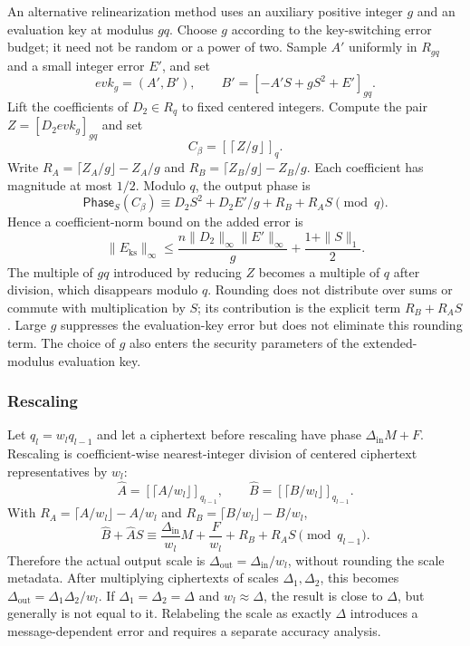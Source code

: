 An alternative relinearization method uses an auxiliary positive integer $g$ and an evaluation key at modulus $gq$. Choose $g$ according to the key-switching error budget; it need not be random or a power of two. Sample $A'$ uniformly in $R_{gq}$ and a small integer error $E'$, and set
\[
\mathit{evk}_g=(A',B'),\qquad B'=[-A'S+gS^2+E']_{gq}.
\]
Lift the coefficients of $D_2\in R_q$ to fixed centered integers. Compute the pair $Z=[D_2\mathit{evk}_g]_{gq}$ and set
\[
C_\beta=\left[\left\lceil Z/g\right\rfloor\right]_q.
\]
Write $R_A=\lceil Z_A/g\rfloor-Z_A/g$ and $R_B=\lceil Z_B/g\rfloor-Z_B/g$. Each coefficient has magnitude at most $1/2$. Modulo $q$, the output phase is
\[
\mathsf{Phase}_S(C_\beta)\equiv D_2S^2+D_2E'/g+R_B+R_AS\pmod q.
\]
Hence a coefficient-norm bound on the added error is
\[
\|E_{\mathrm{ks}}\|_\infty\leq
\frac{n\|D_2\|_\infty\|E'\|_\infty}{g}
+\frac{1+\|S\|_1}{2}.
\]
The multiple of $gq$ introduced by reducing $Z$ becomes a multiple of $q$ after division, which disappears modulo $q$. Rounding does not distribute over sums or commute with multiplication by $S$; its contribution is the explicit term $R_B+R_AS$. Large $g$ suppresses the evaluation-key error but does not eliminate this rounding term. The choice of $g$ also enters the security parameters of the extended-modulus evaluation key.


\subsubsection{Rescaling}
\label{subsubsec:ckks-mult-cipher-rescale}

Let $q_l=w_lq_{l-1}$ and let a ciphertext before rescaling have phase $\Delta_{\mathrm{in}}M+F$. Rescaling is coefficient-wise nearest-integer division of centered ciphertext representatives by $w_l$:
\[
\widehat A=[\lceil A/w_l\rfloor]_{q_{l-1}},\qquad
\widehat B=[\lceil B/w_l\rfloor]_{q_{l-1}}.
\]
With $R_A=\lceil A/w_l\rfloor-A/w_l$ and $R_B=\lceil B/w_l\rfloor-B/w_l$,
\[
\widehat B+\widehat AS\equiv
\frac{\Delta_{\mathrm{in}}}{w_l}M+
\frac{F}{w_l}+R_B+R_AS\pmod {q_{l-1}}.
\]
Therefore the actual output scale is $\Delta_{\mathrm{out}}=\Delta_{\mathrm{in}}/w_l$, without rounding the scale metadata. After multiplying ciphertexts of scales $\Delta_1,\Delta_2$, this becomes $\Delta_{\mathrm{out}}=\Delta_1\Delta_2/w_l$. If $\Delta_1=\Delta_2=\Delta$ and $w_l\approx\Delta$, the result is close to $\Delta$, but generally is not equal to it. Relabeling the scale as exactly $\Delta$ introduces a message-dependent error and requires a separate accuracy analysis.

